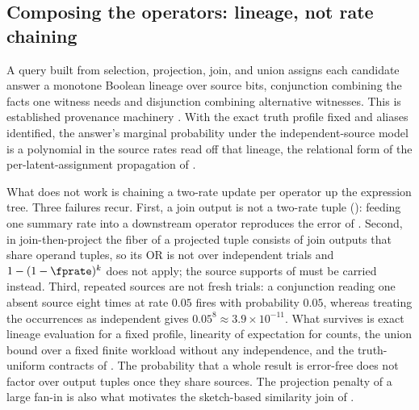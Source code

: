 \subsection*{Composing the operators: lineage, not rate chaining}

A query built from selection, projection, join, and union assigns each candidate
answer a monotone Boolean lineage over source bits, conjunction combining the
facts one witness needs and disjunction combining alternative witnesses. This is
established provenance machinery \parencite{green-karvounarakis-tannen-2007,
suciu-2011}. With the exact truth profile fixed and aliases identified, the
answer's marginal probability under the independent-source model is a polynomial
in the source rates read off that lineage, the relational form of the
per-latent-assignment propagation of .

What does not work is chaining a two-rate update per operator up the expression
tree. Three failures recur. First, a join output
is not a two-rate tuple (): feeding one summary rate into a
downstream operator reproduces the error of .
Second, in join-then-project the fiber of a projected tuple consists of join
outputs that share operand tuples, so its OR is not over independent trials and
$1 - (1 - \fprate)^k$ does not apply; the source supports of
 must be carried instead. Third, repeated
sources are not fresh trials: a conjunction reading one absent source eight times
at rate $0.05$ fires with probability $0.05$, whereas treating the occurrences as
independent gives $0.05^8 \approx 3.9 \times 10^{-11}$. What survives is exact
lineage evaluation for a fixed profile, linearity of expectation for counts, the
union bound over a fixed finite workload without any independence, and the
truth-uniform contracts of . The probability that a
whole result is error-free does not factor over output tuples once they share
sources. The projection penalty of a large fan-in is also what motivates the
sketch-based similarity join of .
